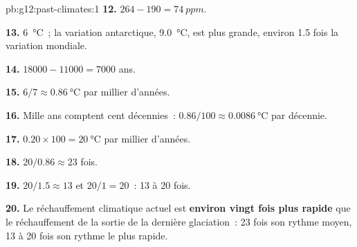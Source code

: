 \begin{solution}{pb:g12:past-climates:1}
\textbf{12.} $264 - 190 = \qty{74}{ppm}$.

\textbf{13.} \qty{6}{\degreeCelsius}~; la variation antarctique,
\qty{9.0}{\degreeCelsius}, est plus grande, environ 1.5 fois la variation
mondiale.

\textbf{14.} $\num{18000} - \num{11000} = \num{7000}$ ans.

\textbf{15.} $6/7 \approx \qty{0.86}{\degreeCelsius}$ par millier d'années.

\textbf{16.} Mille ans comptent cent décennies~: $0.86/100 \approx
\qty{0.0086}{\degreeCelsius}$ par décennie.

\textbf{17.} $0.20 \times 100 = \qty{20}{\degreeCelsius}$ par millier
d'années.

\textbf{18.} $20/0.86 \approx 23$ fois.

\textbf{19.} $20/1.5 \approx 13$ et $20/1 = 20$~: 13 à 20 fois.

\textbf{20.} Le réchauffement climatique actuel est \textbf{environ vingt
fois plus rapide} que le réchauffement de la sortie de la dernière
glaciation~: 23 fois son rythme moyen, 13 à 20 fois son rythme le plus
rapide.
\end{solution}
